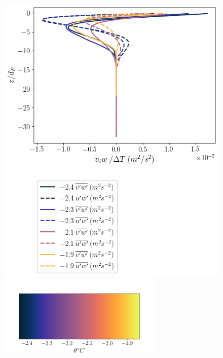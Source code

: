 \begin{figure}
\begin{minipage}{0.5\textwidth}
    \end{minipage}
    \begin{minipage}{0.5\textwidth}
        \includegraphics[trim={0 7.5cm 0 0},clip,width=\textwidth]{Figures/momflux_cmp_dT_43h_tav13_dTscale_z_profile.png}
        \centering \includegraphics[width=0.7\textwidth,trim={1cm 0cm 1cm 5cm}, clip]{Figures/colorbar_thermal_driving.png}
    \end{minipage}%
    \begin{minipage}{0.5\textwidth}

\end{minipage}
\end{figure}
